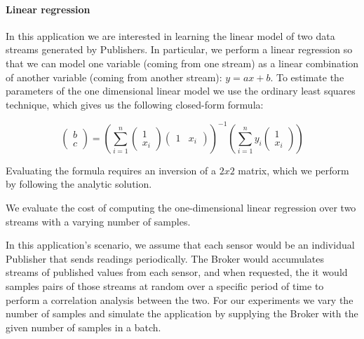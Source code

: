 \paragraph{Linear regression}



In this application we are interested in learning the linear model of two data
streams generated by Publishers.  In particular, we perform a linear regression
so that we can model one variable (coming from one stream) as a linear
combination of another variable (coming from another stream): $y = ax + b$.
To estimate the parameters of the one dimensional linear model we use the
ordinary least squares technique, which gives us the following closed-form
formula:

\[
\begin{pmatrix} b \\ c \end{pmatrix} =
\left( \displaystyle\sum_{i=1}^n \begin{pmatrix} 1 \\ x_i \end{pmatrix}
  \begin{pmatrix} 1 & x_i\end{pmatrix}\right)^{-1}
\left( \displaystyle\sum_{i=1}^n y_i \begin{pmatrix} 1 \\ x_i \end{pmatrix}\right)
\]
\bigskip

Evaluating the formula requires an inversion of a $2 x 2$ matrix, which we perform
by following the analytic solution.

We evaluate the cost of computing the one-dimensional linear regression over
two streams with a varying number of samples.

In this application's scenario, we assume that each sensor would be an
individual Publisher that sends readings periodically.  The Broker would
accumulates streams of published values from each sensor, and when requested,
the it would samples pairs of those streams at random over a specific period of
time to perform a correlation analysis between the two.  For our experiments we
vary the number of samples and simulate the application by supplying the Broker
with the given number of samples in a batch.

